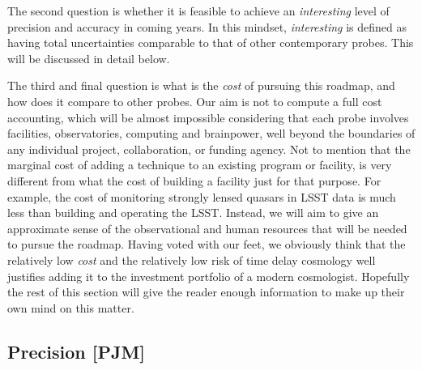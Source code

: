 The second question is whether it is feasible to achieve an {\it
interesting} level of precision and accuracy in coming years. In this
mindset, {\it interesting} is defined as having total uncertainties
comparable to that of other contemporary probes. This will be
discussed in detail below.

The third and final question is what is the {\it cost} of pursuing
this roadmap, and how does it compare to other probes. Our aim is not
to compute a full cost accounting, which will be almost impossible
considering that each probe involves facilities, observatories,
computing and brainpower, well beyond the boundaries of any individual
project, collaboration, or funding agency. Not to mention that the
marginal cost of adding a technique to an existing program or
facility, is very different from what the cost of building a facility
just for that purpose. For example, the cost of monitoring strongly
lensed quasars in LSST data is much less than building and operating
the LSST. Instead, we will aim to give an approximate sense of the
observational and human resources that will be needed to pursue the
roadmap. Having voted with our feet, we obviously think that the
relatively low {\it cost} and the relatively low risk of time delay
cosmology well justifies adding it to the investment portfolio of a
modern cosmologist. Hopefully the rest of this section will give the
reader enough information to make up their own mind on this matter.






\subsection{Precision [PJM]}
\label{ssec:precision}

